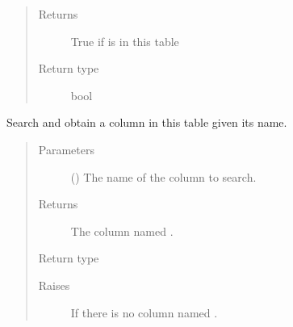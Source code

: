 \documentclass[letterpaper,10pt,english]{sphinxmanual}
\begin{document}
\begin{fulllineitems}
\begin{fulllineitems}
\begin{quote}
\begin{description}
\item[{Returns}] \leavevmode
\sphinxAtStartPar
True if  is in this table

\item[{Return type}] \leavevmode
\sphinxAtStartPar
bool

\end{description}\end{quote}

\end{fulllineitems}


\begin{fulllineitems}
\label{\detokenize{model:mini_sql.model.table.Table.get_column}}
\sphinxAtStartPar
Search and obtain a column in this table given its name.
\begin{quote}\begin{description}
\item[{Parameters}] \leavevmode
\sphinxAtStartPar
{} () \textendash{} The name of the column to search.

\item[{Returns}] \leavevmode
\sphinxAtStartPar
The column named .

\item[{Return type}] \leavevmode
\sphinxAtStartPar
{\hyperref[\detokenize{model:mini_sql.model.column.Column}]{}}

\item[{Raises}] \leavevmode
\sphinxAtStartPar
{} \textendash{} If there is no column named .

\end{description}\end{quote}

\end{fulllineitems}



\end{fulllineitems}
\end{document}
